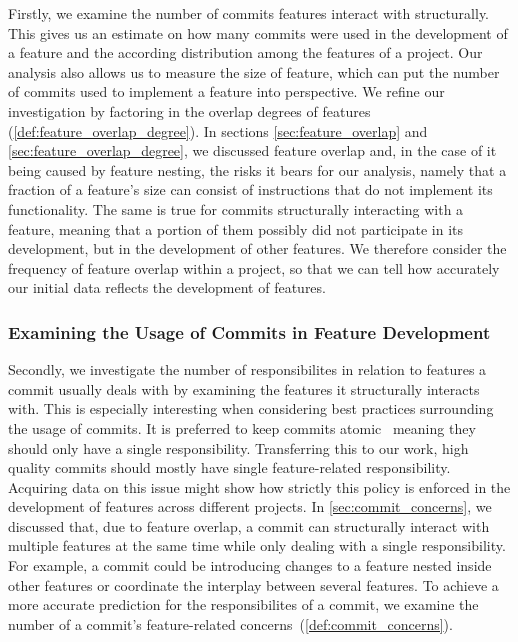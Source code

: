 Firstly, we examine the number of commits features interact with structurally. 
This gives us an estimate on how many commits were used in the development of a feature and the according distribution among the features of a project.
Our analysis also allows us to measure the size of feature, which can put the number of commits used to implement a feature into perspective.
We refine our investigation by factoring in the overlap degrees of features (\autoref{def:feature_overlap_degree}). 
In sections \ref{sec:feature_overlap} and \ref{sec:feature_overlap_degree}, we discussed feature overlap and, in the case of it being caused by feature nesting, the risks it bears for our analysis, namely that a fraction of a feature's size can consist of instructions that do not implement its functionality.
The same is true for commits structurally interacting with a feature, meaning that a portion of them possibly did not participate in its development, but in the development of other features.
We therefore consider the frequency of feature overlap within a project, so that we can tell how accurately our initial data reflects the development of features.

\subsubsection*{Examining the Usage of Commits in Feature Development}

Secondly, we investigate the number of responsibilites in relation to features a commit usually deals with by examining the features it structurally interacts with. 
This is especially interesting when considering best practices surrounding the usage of commits.
It is preferred to keep commits atomic~\cite{hundhausen2021commit_metrics} meaning they should only have a single responsibility.
Transferring this to our work, high quality commits should mostly have single feature-related responsibility.
Acquiring data on this issue might show how strictly this policy is enforced in the development of features across different projects. 
In \autoref{sec:commit_concerns}, we discussed that, due to feature overlap, a commit can structurally interact with multiple features at the same time while only dealing with a single responsibility.
For example, a commit could be introducing changes to a feature nested inside other features or coordinate the interplay between several features.
To achieve a more accurate prediction for the responsibilites of a commit, we examine the number of a commit's feature-related concerns~(\autoref{def:commit_concerns}).


